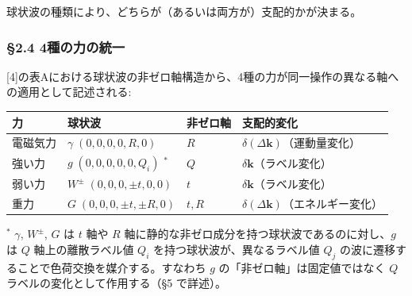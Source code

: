 \documentclass[
  a4paper,11pt]{ltjsarticle}
\newcounter{none}
\theoremstyle{definition}
\theoremstyle{remark}
\begin{document}
球状波の種類により、どちらが（あるいは両方が）支配的かが決まる。

\subsubsection{§2.4
4種の力の統一}\label{ux7a2eux306eux529bux306eux7d71ux4e00}

{[}4{]}の表Aにおける球状波の非ゼロ軸構造から、4種の力が同一操作の異なる軸への適用として記述される:

{\def\LTcaptype{none} %
\begin{longtable}[]{@{}
  >{\raggedright\arraybackslash}p{}
  >{\raggedright\arraybackslash}p{}
  >{\raggedright\arraybackslash}p{}
  >{\raggedright\arraybackslash}p{}@{}}
\toprule\noalign{}
\begin{minipage}[b]{\linewidth}\raggedright
力
\end{minipage} & \begin{minipage}[b]{\linewidth}\raggedright
球状波
\end{minipage} & \begin{minipage}[b]{\linewidth}\raggedright
非ゼロ軸
\end{minipage} & \begin{minipage}[b]{\linewidth}\raggedright
支配的変化
\end{minipage} \\
\midrule\noalign{}
\endhead
\bottomrule\noalign{}
\endlastfoot
電磁気力 & \(\gamma\; (0,0,0,0,R,0)\) & \(R\) &
\(\delta(\Delta\mathbf{k})\)（運動量変化） \\
強い力 & \(g\; (0,0,0,0,0,Q_i)\) \({}^{*}\) & \(Q\) &
\(\delta\mathbf{k}\)（ラベル変化） \\
弱い力 & \(W^{\pm}\; (0,0,0,\pm t,0,0)\) & \(t\) &
\(\delta\mathbf{k}\)（ラベル変化） \\
重力 & \(G\; (0,0,0,\pm t,\pm R,0)\) & \(t, R\) &
\(\delta(\Delta\mathbf{k})\)（エネルギー変化） \\
\end{longtable}
}

\({}^{*}\) \(\gamma\), \(W^{\pm}\), \(G\) は \(t\) 軸や \(R\)
軸に静的な非ゼロ成分を持つ球状波であるのに対し、\(g\) は \(Q\)
軸上の離散ラベル値 \(Q_i\) を持つ球状波が、異なるラベル値 \(Q_j\)
の波に遷移することで色荷交換を媒介する。すなわち \(g\)
の「非ゼロ軸」は固定値ではなく \(Q\) ラベルの変化として作用する（§5
で詳述）。
\end{document}
